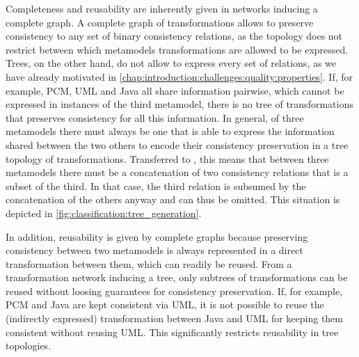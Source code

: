 Completeness and reusability are inherently given in networks inducing a complete graph.
A complete graph of transformations allows to preserve consistency to any set of binary consistency relations, as the topology does not restrict between which metamodels transformations are allowed to be expressed.
Trees, on the other hand, do not allow to express every set of relations, as we have already motivated in \autoref{chap:introduction:challenges:quality:properties}.
If, for example, \gls{PCM}, \gls{UML} and Java all share information pairwise, which cannot be expressed in instances of the third metamodel, there is no tree of transformations that preserves consistency for all this information.
In general, of three metamodels there must always be one that is able to express the information shared between the two others to encode their consistency preservation in a tree topology of transformations.
Transferred to \modellevelconsistencyrelations, this means that between three metamodels there must be a concatenation of two consistency relations that is a subset of the third.
In that case, the third relation is subsumed by the concatenation of the others anyway and can thus be omitted.
This situation is depicted in \autoref{fig:classification:tree_generation}.

In addition, reusability is given by complete graphs because preserving consistency between two metamodels is always represented in a direct transformation between them, which can readily be reused.
From a transformation network inducing a tree, only subtrees of transformations can be reused without loosing guarantees for consistency preservation.
If, for example, \gls{PCM} and Java are kept consistent via \gls{UML}, it is not possible to reuse the (indirectly expressed) transformation between Java and \gls{UML} for keeping them consistent without reusing \gls{UML}.
This significantly restricts reusability in tree topologies.

